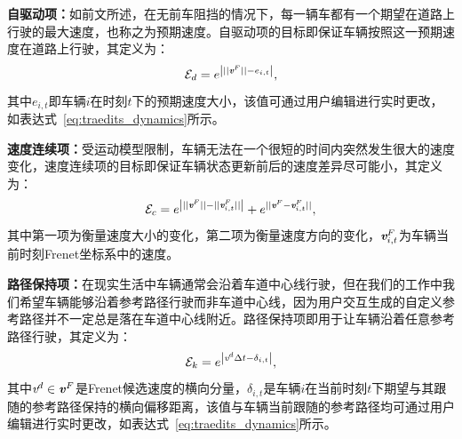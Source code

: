 \textbf{自驱动项：}如前文所述，在无前车阻挡的情况下，每一辆车都有一个期望在道路上行驶的最大速度，也称之为预期速度。自驱动项的目标即保证车辆按照这一预期速度在道路上行驶，其定义为：
\begin{equation}
\setlength\abovedisplayskip{6pt}
\setlength\belowdisplayskip{6pt}
    \mathcal{E}_{d} = e^{\left| ||\emph{\textbf{v}}^{F}|| - e_{i,t} \right| },
\label{eq:traedits_internaldrive}
\end{equation}
其中${e}_{i,t}$即车辆$i$在时刻$t$下的预期速度大小，该值可通过用户编辑进行实时更改，如表达式~\ref{eq:traedits_dynamics}所示。

\textbf{速度连续项：}受运动模型限制，车辆无法在一个很短的时间内突然发生很大的速度变化，速度连续项的目标即保证车辆状态更新前后的速度差异尽可能小，其定义为：
\begin{equation}
\setlength\abovedisplayskip{6pt}
\setlength\belowdisplayskip{6pt}
    \mathcal{E}_{c} = e^{ \left| ||\emph{\textbf{v}}^{F}|| - ||\emph{\textbf{v}}^F_{i,t}|| \right| } + e^{||\emph{\textbf{v}}^{F} - \emph{\textbf{v}}^F_{i,t}||},
\label{eq:traedits_velcontinuity}
\end{equation}
其中第一项为衡量速度大小的变化，第二项为衡量速度方向的变化，$\emph{\textbf{v}}^F_{i,t}$为车辆当前时刻Frenet坐标系中的速度。

\textbf{路径保持项：}在现实生活中车辆通常会沿着车道中心线行驶，但在我们的工作中我们希望车辆能够沿着参考路径行驶而非车道中心线，因为用户交互生成的自定义参考路径并不一定总是落在车道中心线附近。路径保持项即用于让车辆沿着任意参考路径行驶，其定义为：
\begin{equation}
\setlength\abovedisplayskip{6pt}
\setlength\belowdisplayskip{6pt}
    \mathcal{E}_{k} = e^{\left|  \emph{v}^{d} \Delta{t} - \delta_{i,t}  \right|},
\label{eq:traedits_pathkeeping}
\end{equation}
其中$\emph{v}^{d}\in\textbf{\emph{v}}^{F}$是Frenet候选速度的横向分量，$\delta_{i,t}$是车辆$i$在当前时刻$t$下期望与其跟随的参考路径保持的横向偏移距离，该值与车辆当前跟随的参考路径均可通过用户编辑进行实时更改，如表达式~\ref{eq:traedits_dynamics}所示。

